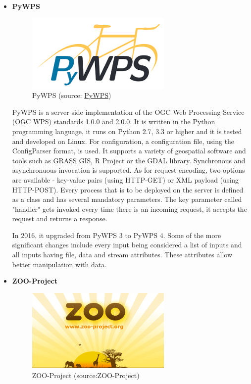 \begin{itemize}
\item \textbf{PyWPS}

\begin{figure}[H] \centering
      \includegraphics[width=200pt]{./pictures/pywps.png}
      \caption[PyWPS logo]{PyWPS (source:
\href{http://pywps.org/images/pywps.png}{PyWPS})}
      \label{fig:PyWPS}
  \end{figure}

PyWPS is a server side implementation of the OGC Web Processing Service (OGC WPS) standards 1.0.0 and 2.0.0. It is written in the Python programming language, it runs on Python 2.7, 3.3 or higher and it is tested and developed on Linux. For configuration, a configuration file, using the ConfigParser format, is used. It supports a variety of geospatial software and tools such as GRASS GIS, R Project or the GDAL library.  Synchronous and asynchronuous invocation is supported. As for request encoding, two options are available - key-value pairs (using HTTP-GET) or XML payload (using HTTP-POST). Every process that is to be deployed on the server is defined as a class and has several mandatory parameters. The key parameter called "handler" gets invoked every time there is an incoming request, it accepts the request and returns a response. 


In 2016, it upgraded from PyWPS 3 to PyWPS 4. Some of the more significant changes include every input being considered a list of inputs and all inputs having file, data and stream attributes. These attributes allow better manipulation with data. 
	
  
	

  


\item \textbf{ZOO-Project}

\begin{figure}[H] \centering
      \includegraphics[width=200pt]{./pictures/zoo.png}
      \caption[ZOO-Project logo]{ZOO-Project (source:ZOO-Project)}
      \label{fig:ZOO-Project}
  \end{figure}


\end{itemize}
